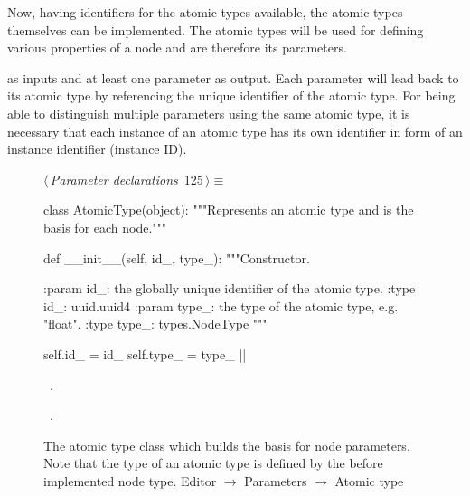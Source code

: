 \documentclass[%
    a4paper,    %
    justified,  %
    nobib,      %
    openany     %
]{tufte-book}
\makeatletter
\renewcommand{\label}[1]{\@tufte@label{##1}}%
\makeatother
\begin{document}
Now, having identifiers for the atomic types available, the atomic types
themselves can be implemented. The atomic types will be used for defining
various properties of a node and are therefore its parameters.

 as inputs and at least
one parameter as output. Each parameter will lead back to its atomic type by
referencing the unique identifier of the atomic type. For being able to
distinguish multiple parameters using the same atomic type, it is necessary that
each instance of an atomic type has its own identifier in form of an instance
identifier (instance ID).

\begin{figure}[!htbp]
\begin{flushleft} \small
\begin{minipage}{\linewidth}\label{scrap63}\raggedright\small
{} $\langle\,${\itshape Parameter declarations}\nobreak\ {\footnotesize {125}}$\,\rangle\equiv$
\vspace{-1ex}
\begin{pythoncode}
class AtomicType(object):
    """Represents an atomic type and is the basis for each
    node."""

    def __init__(self, id_, type_):
        """Constructor.

        :param id_: the globally unique identifier of the
                    atomic type.
        :type  id_: uuid.uuid4
        :param type_: the type of the atomic type, e.g. "float".
        :type  type_: types.NodeType
        """

        self.id_   = id_
        self.type_ = type_
|\NWsep|
\end{pythoncode}
\vspace{1.5ex}
\footnotesize
\begin{list}{}{\setlength{\itemsep}{-\parsep}\setlength{\itemindent}{-\leftmargin}}
\item \NWtxtMacroDefBy\ .
\item \NWtxtMacroRefIn\ .

\item{}
\end{list}
\end{minipage}\vspace{4ex}
\end{flushleft}
\caption{The atomic type class which builds the basis for node parameters. Note
  that the type of an atomic type is defined by the before implemented node
  type.
  \newline{}\newline{}Editor $\rightarrow$ Parameters $\rightarrow$ Atomic type}
\end{figure}
\end{document}
